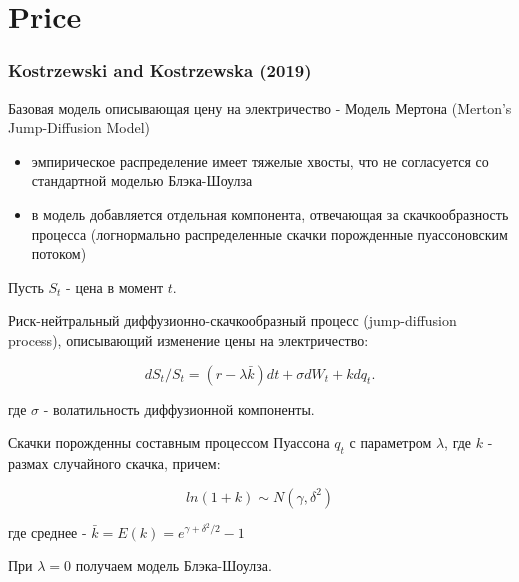 \documentclass[c, dvipsnames]{beamer}  %
\begin{document}
\section{Price}

\begin{frame}[shrink=5]
\frametitle{ Kostrzewski and Kostrzewska (2019)} 

Базовая модель описывающая цену на электричество - Модель Мертона (Merton’s Jump-Diffusion Model)

\begin{itemize}
	\item эмпирическое распределение имеет тяжелые хвосты, что не согласуется со стандартной моделью Блэка-Шоулза
	\item  в модель добавляется отдельная компонента, отвечающая за скачкообразность процесса (логнормально распределенные скачки порожденные пуассоновским потоком)    
\end{itemize}

Пусть $S_t$ - цена в момент $t$.

Риск-нейтральный диффузионно-скачкообразный процесс (jump-diffusion process), описывающий изменение цены на электричество:

$$dS_t/S_t=(r−\lambda \bar{k})dt+\sigma dW_t+kdq_t.$$

где $\sigma$ - волатильность диффузионной компоненты. 

Скачки порожденны составным процессом Пуассона  $q_t$  с параметром  $\lambda$, где $k$  - размах случайного скачка, причем:

$$ln(1 +k)\sim N(\gamma,\delta^2)$$

где среднее - $\bar{k} = E(k)=e^{\gamma + \delta^2/2}-1$

При  $\lambda=0$ получаем модель Блэка-Шоулза.



\end{frame}
\end{document}
